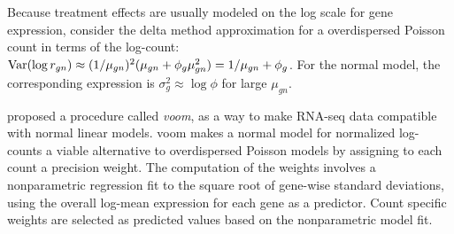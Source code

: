 
Because treatment effects are usually modeled on the log scale for gene expression, consider the delta method  approximation for a overdispersed Poisson count in terms of the log-count: $\operatorname{Var}(\log r_{gn}) \approx (1/\mu_{gn})^2(\mu_{gn} + \phi_g\mu_{gn}^2)=1/\mu_{gn} + \phi_g$. For the normal model, the corresponding expression is $\sigma^2_g\approx \log \phi$ for large $\mu_{gn}$.


\cite{voom} proposed a procedure called \textit{voom}, as a way to make RNA-seq data compatible with normal linear models. voom makes a normal model for normalized log-counts a viable alternative to overdispersed Poisson models by assigning to each count a precision weight. The computation of the weights involves a nonparametric regression fit to the square root of gene-wise standard deviations, using the overall log-mean expression for each gene as a predictor. Count specific weights are selected as predicted values based on the nonparametric model fit.

